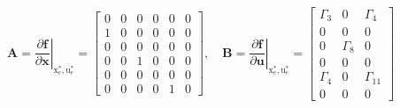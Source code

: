 \documentclass[3p]{elsarticle}
\begin{document}


\begin{equation}
    \mathbf{A} = \left.\dfrac{\partial \mathbf{f}}{\partial \mathbf{x}}\right|_{\boldsymbol{{\mathrm{x}}}_e^*, \boldsymbol{{\mathrm{u}}}_e^*} = \begin{bmatrix}
        0 & 0 & 0 & 0 & 0 & 0 \\
        1 & 0 & 0 & 0 & 0 & 0 \\
        0 & 0 & 0 & 0 & 0 & 0 \\
        0 & 0 & 1 & 0 & 0 & 0 \\
        0 & 0 & 0 & 0 & 0 & 0 \\
        0 & 0 & 0 & 0 & 1 & 0
    \end{bmatrix}, \quad \mathbf{B} = \left.\dfrac{\partial \mathbf{f}}{\partial \mathbf{u}}\right|_{\boldsymbol{{\mathrm{x}}}_e^*, \boldsymbol{{\mathrm{u}}}_e^*} = 
    \begin{bmatrix}
       \Gamma_3 & 0 & \Gamma_4\\
       0 & 0 & 0 \\
       0 & \Gamma_8 & 0 \\
       0 & 0 & 0 \\
       \Gamma_4 & 0 & \Gamma_{11} \\
       0 & 0 & 0
   \end{bmatrix}
\end{equation}
\end{document}

